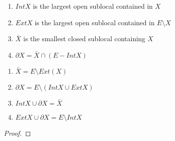 \begin{definition}
    \label{def:further_topology}
    \leanok
    \begin{enumerate}
        \item $Int X$ is the largest open sublocal contained in $X$
        \item $Ext X$ is the largest open sublocal contained in $E \setminus X$
        \item $\bar{X}$ is the smallest closed sublocal containing $X$
        \item $\partial X = \bar{X} \cap (E - Int X)$
    \end{enumerate}
\end{definition}

\begin{lemma} 
    \label{lem:properties_of_further_topology}
    \leanok
    \begin{enumerate}
        \item $\bar{X} = E \setminus Ext(X)$
        \item $\partial X = E \setminus (Int X \cup Ext X)$
        \item $Int X \cup \partial X = \bar X$
        \item $Ext X \cup \partial X = E \setminus Int X$
    \end{enumerate}
\end{lemma}

\begin{proof}
\end{proof}


